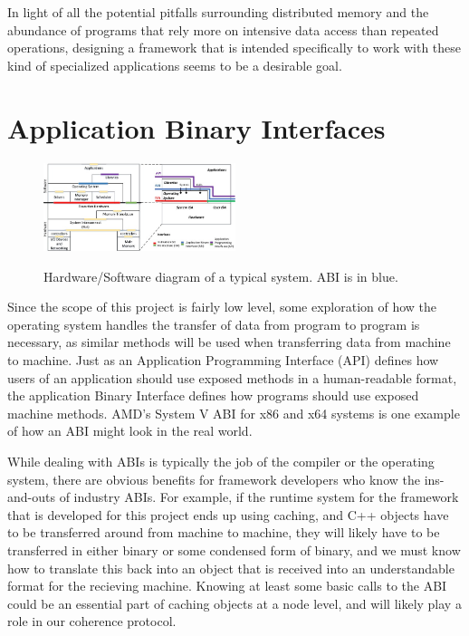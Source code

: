 In light of all the potential pitfalls surrounding distributed memory and the abundance of programs that rely more on intensive data access than repeated operations, designing a framework that is intended specifically to work with these kind of specialized applications seems to be a desirable goal. 

\section{Application Binary Interfaces}
\begin{figure}[h]
	\centering
	\includegraphics[width=0.5\textwidth]{Figures/abi.jpg}
	\label{fig:abi}
	\caption{ Hardware/Software diagram of a typical system. ABI is in blue. \cite{virtualization}}
\end{figure}
Since the scope of this project is fairly low level, some exploration of how the operating system handles the transfer of data from program to program is necessary, as similar methods will be used when transferring data from machine to machine. Just as an Application Programming Interface (API) defines how users of an application should use exposed methods in a human-readable format, the application Binary Interface defines how programs should use exposed machine methods. AMD's System V ABI for x86 and x64 systems \cite{amd_x86_64} is one example of how an ABI might look in the real world.




While dealing with ABIs is typically the job of the compiler or the operating system, there are obvious benefits for framework developers who know the ins-and-outs of industry ABIs. For example, if the runtime system for the framework that is developed for this project ends up using caching, and C++ objects have to be transferred around from machine to machine, they will likely have to be transferred in either binary or some condensed form of binary, and we must know how to translate this back into an object that is received into an understandable format for the recieving machine. Knowing at least some basic calls to the ABI could be an essential part of caching objects at a node level, and will likely play a role in our coherence protocol. 

